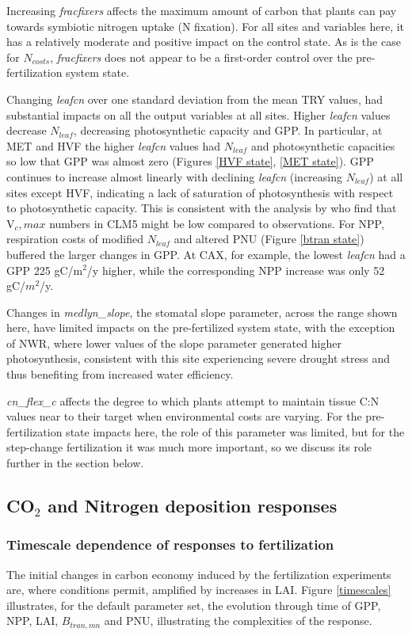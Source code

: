 \documentclass[draft,linenumbers]{agujournal}
\begin{document}
Increasing \emph{fracfixers} affects the maximum amount of carbon that plants can pay towards symbiotic nitrogen uptake (N fixation). For all sites and variables here, it has a relatively moderate and positive impact on the control state. As is the case for $N_{costs}$, \emph{fracfixers} does not appear to be a first-order control over the pre-fertilization system state.

Changing \emph{leafcn} over one standard deviation from the mean TRY values, had substantial impacts on all the output variables at all sites. Higher \emph{leafcn} values decrease $N_{leaf}$, decreasing photosynthetic capacity and GPP.  In particular, at MET and HVF the higher \emph{leafcn} values had $N_{leaf}$ and photosynthetic capacities so low that GPP was almost zero (Figures \ref{HVF state}, \ref{MET state}).  GPP continues to increase almost linearly with declining \emph{leafcn}  (increasing $N_{leaf}$) at all sites except HVF, indicating a lack of saturation of photosynthesis with respect to photosynthetic capacity.  This is consistent with the analysis by \cite{lawrence2018} who find that V${_c,max}$ numbers in CLM5 might be low compared to observations.  For NPP, respiration costs of modified $N_{leaf}$ and altered PNU (Figure \ref{btran state}) buffered the larger changes in GPP. At CAX, for example, the lowest \emph{leafcn} had a GPP 225 gC/m$^{2}$/y higher, while the corresponding NPP increase was only 52 gC/$m^{2}$/y.

Changes in \emph{medlyn\_slope}, the stomatal slope parameter, across the range shown here, have limited impacts on the pre-fertilized system state, with the exception of NWR, where lower values of the slope parameter generated higher photosynthesis, consistent with this site experiencing severe drought stress and thus benefiting from increased water efficiency. 

\emph{cn\_flex\_c} affects the degree to which plants attempt to maintain tissue C:N values near to their target when environmental costs are varying. For the pre-fertilization state impacts here, the role of this parameter was limited, but for the step-change fertilization it was much more important, so we discuss its role further in the section below. 

\subsection{CO$_{2}$ and Nitrogen deposition responses}

\subsubsection{Timescale dependence of responses to fertilization}
The initial changes in carbon economy induced by the fertilization experiments are, where conditions permit, amplified by increases in LAI. Figure \ref{timescales} illustrates, for the default parameter set, the evolution through time of GPP, NPP, LAI, $B_{tran,mn}$ and PNU, illustrating the complexities of the response. 
\end{document}
